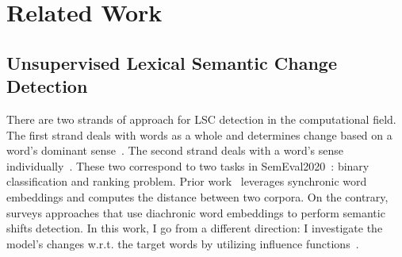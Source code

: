 \section{Related Work}


\subsection{Unsupervised Lexical Semantic Change Detection}




There are two strands of approach for LSC detection in the computational field.
The first strand deals with words as a whole and determines change based on a word's dominant sense~\cite{dominant-sense1,dominant-sense2}.
The second strand deals with a word's sense individually~\cite{second-strand1,second-strand2}.
These two correspond to two tasks in SemEval2020~\cite{semeval2020}: binary classification and ranking problem.
Prior work~\cite{temporalteller} leverages synchronic word embeddings and computes the distance between two corpora.
On the contrary, ~\cite{diachronic-survey} surveys approaches that use diachronic word embeddings to perform semantic shifts detection.
In this work, I go from a different direction: I investigate the model's changes w.r.t. the target words by utilizing influence functions~\cite{influence_fn}.
